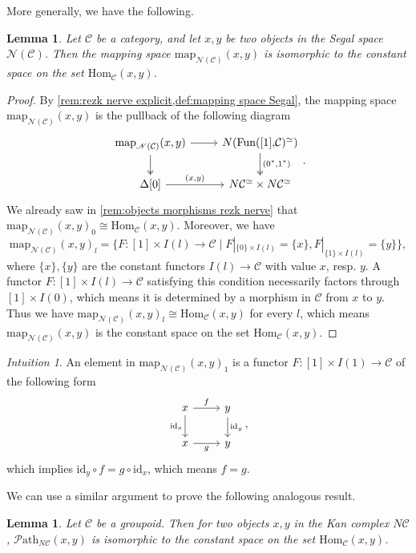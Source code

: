 \documentclass[11pt, a4paper]{amsart}
\newcommand{\cC}{\mathcal{C}}
\newcommand{\sN}{\mathscr{N}}
\newcommand{\Hom}{\mathrm{Hom}}
\newcommand{\map}{\mathrm{map}}
\newcommand{\Fun}{\mathrm{Fun}}
\newcommand{\id}{\mathrm{id}}
\newcommand{\Path}{\mathscr{P}\mathrm{ath}}
\newtheorem{lemma}[equation]{Lemma}
\theoremstyle{definition}
\theoremstyle{remark}
\newtheorem{intuition}[equation]{Intuition}
\numberwithin{equation}{section}
\begin{document}
More generally, we have the following.

\begin{lemma} \label{lemma:homotopic morphisms are equal}
  Let $\cC$ be a category, and let $x,y$ be two objects in the Segal space $\sN(\cC)$. Then the mapping space $\map_{\sN(\cC)}(x,y)$ is isomorphic to the constant space on the set $\Hom_{\cC}(x,y)$.
\end{lemma}

\begin{proof}
  By \cref{rem:rezk nerve explicit,def:mapping space Segal}, the mapping space $\map_{\sN(\cC)}(x,y)$ is the pullback of the following diagram
  \[
  \begin{tikzcd}
    \map_{\sN(\cC)}(x,y) \arrow[d, twoheadrightarrow] \arrow[r] & N(\Fun([1]{,}\cC)^\simeq) \arrow[d, "{(0^*,1^*)}", twoheadrightarrow] \\
    \Delta[0] \arrow[r, "{(x,y)}"] & N\cC^\simeq \times N\cC^\simeq
  \end{tikzcd}.
  \]
  We already saw in \cref{rem:objects morphisms rezk nerve} that $\map_{\sN(\cC)}(x,y)_0 \cong \Hom_{\cC}(x,y)$. Moreover, we have 
  \[\map_{\sN(\cC)}(x,y)_l = \{F\colon [1] \times I(l) \to \cC \mid F|_{\{0\} \times I(l)} = \{x\}, F|_{\{1\} \times I(l)} = \{y\}\}, \]
  where $\{x\}, \{y\}$ are the constant functors $I(l) \to \cC$ with value $x$, resp. $y$. A functor $F\colon [1] \times I(l) \to \cC$ satisfying this condition necessarily factors through $[1] \times I(0)$, which means it is determined by a morphism in $\cC$ from $x$ to $y$. Thus we have $\map_{\sN(\cC)}(x,y)_l \cong \Hom_{\cC}(x,y)$ for every $l$, which means $\map_{\sN(\cC)}(x,y)$ is the constant space on the set $\Hom_{\cC}(x,y)$. 
\end{proof}

\begin{intuition}
  An element in $\map_{\sN(\cC)}(x,y)_1$ is a functor $F\colon [1] \times I(1) \to \cC$ of the following form 
  \[ 
  \begin{tikzcd}
    x \arrow[r, "f"] \arrow[d, "\id_x"'] & y \arrow[d, "\id_y"] \\
    x \arrow[r, "g"'] & y
  \end{tikzcd},
  \]
  which implies $\id_y \circ f = g \circ \id_x$, which means $f=g$. 
\end{intuition}

We can use a similar argument to prove the following analogous result.

\begin{lemma} \label{lemma:homotopic morphisms are equal iso}
 Let $\cC$ be a groupoid. Then for two objects $x,y$ in the Kan complex $N\cC$, $\Path_{N\cC}(x,y)$ is isomorphic to the constant space on the set $\Hom_{\cC}(x,y)$.   
\end{lemma}
\end{document}
